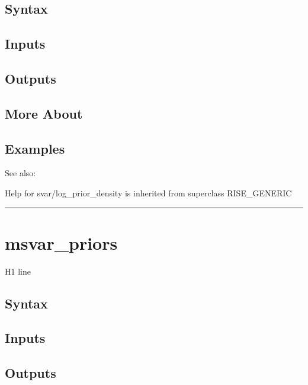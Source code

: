 \documentclass[letterpaper,10pt,english]{sphinxmanual}
\begin{document}
\subsection{Syntax}
\label{classes/models/@svar/svar:id62}

\subsection{Inputs}
\label{classes/models/@svar/svar:id63}

\subsection{Outputs}
\label{classes/models/@svar/svar:id64}

\subsection{More About}
\label{classes/models/@svar/svar:id65}

\subsection{Examples}
\label{classes/models/@svar/svar:id66}
See also:

Help for svar/log\_prior\_density is inherited from superclass RISE\_GENERIC


\bigskip\hrule{}\bigskip



\section{msvar\_priors}
\label{classes/models/@svar/svar:id67}\label{classes/models/@svar/svar:msvar-priors}
H1 line


\subsection{Syntax}
\label{classes/models/@svar/svar:id68}

\subsection{Inputs}
\label{classes/models/@svar/svar:id69}

\subsection{Outputs}
\label{classes/models/@svar/svar:id70}
\end{document}
